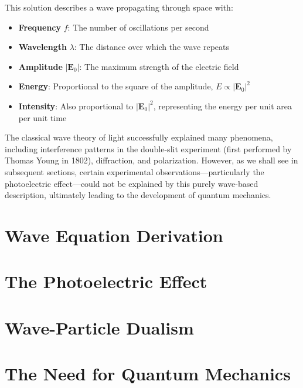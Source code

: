 This solution describes a wave propagating through space with:
\begin{itemize}
    \item \textbf{Frequency} $f$: The number of oscillations per second
    \item \textbf{Wavelength} $\lambda$: The distance over which the wave repeats
    \item \textbf{Amplitude} $|\boldsymbol{E}_0|$: The maximum strength of the electric field
    \item \textbf{Energy}: Proportional to the square of the amplitude, $E \propto |\boldsymbol{E}_0|^2$
    \item \textbf{Intensity}: Also proportional to $|\boldsymbol{E}_0|^2$, representing the energy per unit area per unit time
\end{itemize}

The classical wave theory of light successfully explained many phenomena, including interference patterns in the double-slit experiment (first performed by Thomas Young in 1802), diffraction, and polarization. However, as we shall see in subsequent sections, certain experimental observations—particularly the photoelectric effect—could not be explained by this purely wave-based description, ultimately leading to the development of quantum mechanics.

\section{Wave Equation Derivation}

\section{The Photoelectric Effect}

\section{Wave-Particle Dualism}

\section{The Need for Quantum Mechanics}
